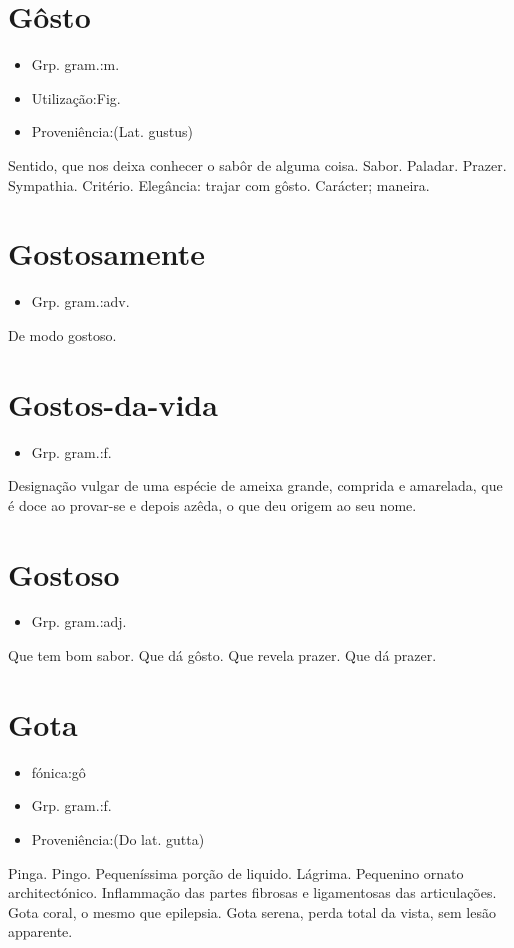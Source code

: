\section{Gôsto}
\begin{itemize}
\item {Grp. gram.:m.}
\end{itemize}
\begin{itemize}
\item {Utilização:Fig.}
\end{itemize}
\begin{itemize}
\item {Proveniência:(Lat. \textunderscore gustus\textunderscore )}
\end{itemize}
Sentido, que nos deixa conhecer o sabôr de alguma coisa.
Sabor.
Paladar.
Prazer.
Sympathia.
Critério.
Elegância: \textunderscore trajar com gôsto\textunderscore .
Carácter; maneira.
\section{Gostosamente}
\begin{itemize}
\item {Grp. gram.:adv.}
\end{itemize}
De modo gostoso.
\section{Gostos-da-vida}
\begin{itemize}
\item {Grp. gram.:f.}
\end{itemize}
Designação vulgar de uma espécie de ameixa grande, comprida e amarelada, que é doce ao provar-se e depois azêda, o que deu origem ao seu nome.
\section{Gostoso}
\begin{itemize}
\item {Grp. gram.:adj.}
\end{itemize}
Que tem bom sabor.
Que dá gôsto.
Que revela prazer.
Que dá prazer.
\section{Gota}
\begin{itemize}
\item {fónica:gô}
\end{itemize}
\begin{itemize}
\item {Grp. gram.:f.}
\end{itemize}
\begin{itemize}
\item {Proveniência:(Do lat. \textunderscore gutta\textunderscore )}
\end{itemize}
Pinga.
Pingo.
Pequeníssima porção de liquido.
Lágrima.
Pequenino ornato architectónico.
Inflammação das partes fibrosas e ligamentosas das articulações.
\textunderscore Gota coral\textunderscore , o mesmo que \textunderscore epilepsia\textunderscore .
\textunderscore Gota serena\textunderscore , perda total da vista, sem lesão apparente.
